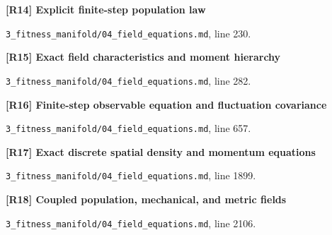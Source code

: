 \documentclass[11pt,a4paper]{article}
\begin{document}
\par\medskip\noindent\begin{minipage}{\linewidth}\textbf{[R14] Explicit finite-step population law}\label{src:thm-algorithmic-explicit-transition}\par
{\small\texttt{}\par
\nolinkurl{3_fitness_manifold/04_field_equations.md}, line 230.\par}
\end{minipage}\par

\par\medskip\noindent\begin{minipage}{\linewidth}\textbf{[R15] Exact field characteristics and moment hierarchy}\label{src:thm-algorithmic-field-characteristics}\par
{\small\texttt{}\par
\nolinkurl{3_fitness_manifold/04_field_equations.md}, line 282.\par}
\end{minipage}\par

\par\medskip\noindent\begin{minipage}{\linewidth}\textbf{[R16] Finite-step observable equation and fluctuation covariance}\label{src:thm-algorithmic-observable-increment}\par
{\small\texttt{}\par
\nolinkurl{3_fitness_manifold/04_field_equations.md}, line 657.\par}
\end{minipage}\par

\par\medskip\noindent\begin{minipage}{\linewidth}\textbf{[R17] Exact discrete spatial density and momentum equations}\label{src:thm-algorithmic-spatial-field-equations}\par
{\small\texttt{}\par
\nolinkurl{3_fitness_manifold/04_field_equations.md}, line 1899.\par}
\end{minipage}\par

\par\medskip\noindent\begin{minipage}{\linewidth}\textbf{[R18] Coupled population, mechanical, and metric fields}\label{src:thm-algorithmic-coupled-field-system}\par
{\small\texttt{}\par
\nolinkurl{3_fitness_manifold/04_field_equations.md}, line 2106.\par}
\end{minipage}\par
\end{document}
